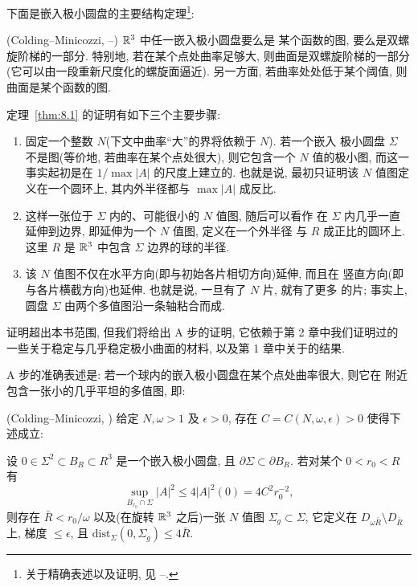 下面是嵌入极小圆盘的主要结构定理\footnote{关于精确表述以及证明, 见
\cite{CM3}--\cite{CM6}.}:

\begin{theorem}
\label{thm:8.1}
(Colding--Minicozzi, \cite{CM3}--\cite{CM6}) $\mathbb{R}^3$ 中任一嵌入极小圆盘要么是
某个函数的图, 要么是双螺旋阶梯的一部分. 特别地, 若在某个点处曲率足够大,
则曲面是双螺旋阶梯的一部分(它可以由一段重新尺度化的螺旋面逼近).
另一方面, 若曲率处处低于某个阈值, 则曲面是某个函数的图.
\end{theorem}

定理~\ref{thm:8.1} 的证明有如下三个主要步骤:

\begin{enumerate}
\item[(A)] 固定一个整数 $N$(下文中曲率``大''的界将依赖于 $N$). 若一个嵌入
极小圆盘 $\Sigma$ 不是图(等价地, 若曲率在某个点处很大), 则它包含一个
$N$ 值的极小图, 而这一事实起初是在 $1/\max|A|$ 的尺度上建立的. 也就是说,
最初只证明该 $N$ 值图定义在一个圆环上, 其内外半径都与 $\max|A|$ 成反比.

\item[(B)] 这样一张位于 $\Sigma$ 内的、可能很小的 $N$ 值图, 随后可以看作
在 $\Sigma$ 内几乎一直延伸到边界, 即延伸为一个 $N$ 值图, 定义在一个外半径
与 $R$ 成正比的圆环上. 这里 $R$ 是 $\mathbb{R}^3$ 中包含 $\Sigma$ 边界的球的半径.

\item[(C)] 该 $N$ 值图不仅在水平方向(即与初始各片相切方向)延伸, 而且在
竖直方向(即与各片横截方向)也延伸. 也就是说, 一旦有了 $N$ 片, 就有了更多
的片; 事实上, 圆盘 $\Sigma$ 由两个多值图沿一条轴粘合而成.
\end{enumerate}


证明超出本书范围, 但我们将给出 A 步的证明, 它依赖于第 2 章中我们证明过的
一些关于稳定与几乎稳定极小曲面的材料, 以及第 1 章中关于的结果.

A 步的准确表述是: 若一个球内的嵌入极小圆盘在某个点处曲率很大, 则它在
附近包含一张小的几乎平坦的多值图, 即:

\begin{theorem}
\label{thm:8.2}
(Colding--Minicozzi, \cite{CM4}) 给定 $N,\omega>1$ 及 $\epsilon>0$, 存在
$C=C(N,\omega,\epsilon)>0$ 使得下述成立:

设 $0\in\Sigma^2\subset B_R\subset R^3$ 是一个嵌入极小圆盘, 且
$\partial\Sigma\subset\partial B_R$. 若对某个 $0<r_0<R$ 有
\[
\sup_{B_{r_0}\cap\Sigma}|A|^2\leq 4|A|^2(0)=4C^2r_0^{-2},
\]
则存在 $\bar R<r_0/\omega$ 以及(在旋转 $\mathbb{R}^3$ 之后)一张 $N$ 值图
$\Sigma_g\subset\Sigma$, 它定义在 $D_{\omega\bar R}\setminus D_{\bar R}$ 上,
梯度 $\leq\epsilon$, 且 $\mathrm{dist}_\Sigma(0,\Sigma_g)\leq 4\bar R$.
\end{theorem}


